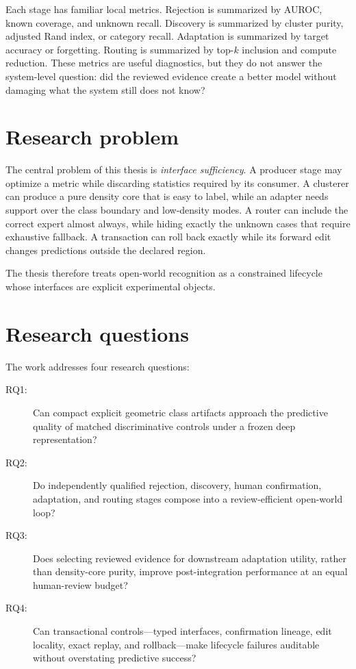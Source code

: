 \documentclass[12pt,oneside]{report}
\begin{document}
Each stage has familiar local metrics. Rejection is summarized by AUROC,
known coverage, and unknown recall. Discovery is summarized by cluster purity,
adjusted Rand index, or category recall. Adaptation is summarized by target
accuracy or forgetting. Routing is summarized by top-$k$ inclusion and compute
reduction. These metrics are useful diagnostics, but they do not answer the
system-level question: did the reviewed evidence create a better model without
damaging what the system still does not know?

\section{Research problem}

The central problem of this thesis is \emph{interface sufficiency}. A producer
stage may optimize a metric while discarding statistics required by its
consumer. A clusterer can produce a pure density core that is easy to label,
while an adapter needs support over the class boundary and low-density modes.
A router can include the correct expert almost always, while hiding exactly
the unknown cases that require exhaustive fallback. A transaction can roll
back exactly while its forward edit changes predictions outside the declared
region.

The thesis therefore treats open-world recognition as a constrained lifecycle
whose interfaces are explicit experimental objects.

\section{Research questions}

The work addresses four research questions:

\begin{description}
\item[RQ1:] Can compact explicit geometric class artifacts approach the
predictive quality of matched discriminative controls under a frozen deep
representation?

\item[RQ2:] Do independently qualified rejection, discovery, human
confirmation, adaptation, and routing stages compose into a review-efficient
open-world loop?

\item[RQ3:] Does selecting reviewed evidence for downstream adaptation utility,
rather than density-core purity, improve post-integration performance at an
equal human-review budget?

\item[RQ4:] Can transactional controls---typed interfaces, confirmation
lineage, edit locality, exact replay, and rollback---make lifecycle failures
auditable without overstating predictive success?
\end{description}
\end{document}
